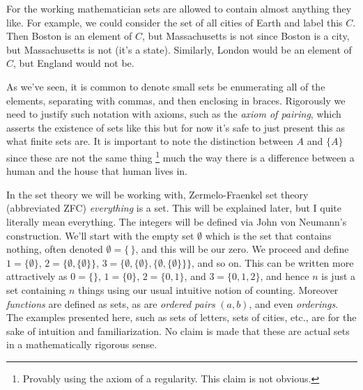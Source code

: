         \begin{example}
            For the working mathematician sets are allowed to contain almost
            anything they like. For example, we could consider the set of all
            cities of Earth and label this $C$. Then Boston is an element of
            $C$, but Massachusetts is not since Boston is a city, but
            Massachusetts is not (it's a state). Similarly, London would be an
            element of $C$, but England would not be.
        \end{example}
        As we've seen, it is common to denote small sets be enumerating all of
        the elements, separating with commas, and then enclosing in braces.
        Rigorously we need to justify such notation with axioms, such as the
        \textit{axiom of pairing}, which asserts the
        existence of sets like this but for now it's safe to just present this
        as what finite sets are. It is important to note the distinction
        between $A$ and $\{A\}$ since these are not the same thing%
        \footnote{%
            Provably using the axiom of a regularity. This claim is not obvious.
        }
        much the way there is a difference between a human and the house that
        human lives in.
        \begin{example}
            \label{ex:Everything_is_a_Set}%
            In the set theory we will be working with, Zermelo-Fraenkel set
            theory (abbreviated \gls{ZFC})
            \textit{everything} is a set. This will be explained later, but I
            quite literally mean everything. The integers will be defined via
            John von Neumann's construction. We'll
            start with the empty set $\emptyset$ which is the
            set that contains nothing, often denoted $\emptyset=\{\,\}$, and
            this will be our zero. We proceed and define
            $1=\{\emptyset\}$, $2=\{\emptyset,\{\emptyset\}\}$,
            $3=\{\emptyset,\{\emptyset\},\{\emptyset,\{\emptyset\}\}\}$, and so
            on. This can be written more attractively as $0=\{\}$, $1=\{0\}$,
            $2=\{0,1\}$, and $3=\{0,1,2\}$, and hence $n$ is just a set
            containing $n$ things using our usual intuitive notion of counting.
            Moreover \textit{functions} are defined as sets, as are
            \textit{ordered pairs} $(a,b)$, and even \textit{orderings}. The
            examples presented here, such as sets of letters, sets of cities,
            etc., are for the sake of intuition and familiarization. No claim is
            made that these are actual sets in a mathematically rigorous sense.
        \end{example}
